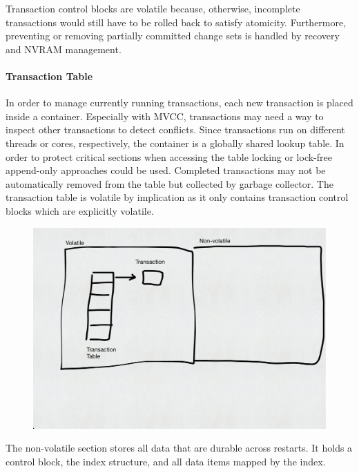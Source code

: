 Transaction control blocks are volatile because, otherwise, incomplete
transactions would still have to be rolled back to satisfy atomicity.
Furthermore, preventing or removing partially committed change sets is handled
by recovery and NVRAM management.

\paragraph{Transaction Table}

In order to manage currently running transactions, each new transaction is
placed inside a container. Especially with MVCC, transactions may need a way to
inspect other transactions to detect conflicts. Since transactions run on
different threads or cores, respectively, the container is a globally shared
lookup table. In order to protect critical sections when accessing the table
locking or lock-free append-only approaches could be used. Completed
transactions may not be automatically removed from the table but collected by
garbage collector. The transaction table is volatile by implication as it only
contains transaction control blocks which are explicitly volatile.


\begin{figure}[!ht]
    \centering
    \includegraphics[width=\textwidth]{figures/drafts/concept-struct-volatile.pdf}
    \caption{}
    \label{fig:concept-struct-volatile}
\end{figure}

The non-volatile section stores all data that are durable across restarts. It
holds a control block, the index structure, and all data items mapped by the
index.

